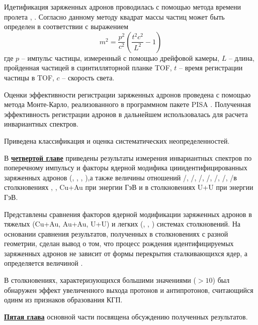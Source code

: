 Идетификация заряженных адронов проводилась с помощью метода времени пролета \autocite{nucleus2020}, \cite{PPG026, PPG146}. Согласно данному методу  квадрат массы частиц может быть определен в соответствии с выражением 
$$m^2 = \frac{p^2}{c^2} \left(  \frac{t^2 c^2}{L^2} - 1\right)$$
где $p$ -- импульс частицы, измеренный с помощью дрейфовой камеры, $L$ -- длина, пройденная частицей в сцинтилляторной планке TOF, $t$ -- время регистрации частицы в TOF,  $c$ -- скорость света.

Оценки эффективности регистрации заряженных адронов проведена с помощью метода Монте-Карло, реализованного в программном пакете PISA \cite{PISA}. Полученная эффективность регистрации адронов в дальнейшем использовалась для расчета инвариантных спектров. 

Приведена классификация и оценка систематических неопределенностей. %

\begin{comment}
Формулы в строку без номера добавляются так:
\[
    \lambda_{T_s} = K_x\frac{d{x}}{d{T_s}}, \qquad
    \lambda_{q_s} = K_x\frac{d{x}}{d{q_s}},
\]
\end{comment}

В \underline{\textbf{четвертой главе}} приведены результаты измерения инвариантных спектров по поперечному импульсу и факторы ядерной модифика цииидентифицированных заряженных адронов (\pipm, \Kpm, \prot, \aprot),а также величины отношений \pim/\pip, \Km/\Kp, \prot/\aprot, \prot/\pip, \aprot/\pim, \Kp/\pip, \Km/\pim в столкновениях  \pal, \heau, Cu+Au при энергии  ГэВ и в столкновениях U+U при энергии  ГэВ.

Представлены сравнения факторов ядерной модификации заряженных адронов в тяжелых (Cu+Au, Au+Au, U+U) и легких (\pal, \dau, \heau) системах столкновений.
На основании сравнения результатов, полученных в столкновениях с разной геометрии, сделан вывод о том, что процесс рождения идентифицируемых заряженных адронов не зависит от формы перекрытия сталкивающихся ядер, а определяется величиной \Npart.

В столкновениях, характеризующихся большими значениями \Npart (\Npart$>10$) был обнаружен эффект увеличенного выхода протонов и антипротонов, считающийся одинм из признаков образования КГП.

\underline{\textbf{Пятая глава}} основной части посвящена обсуждению полученных результатов. 

